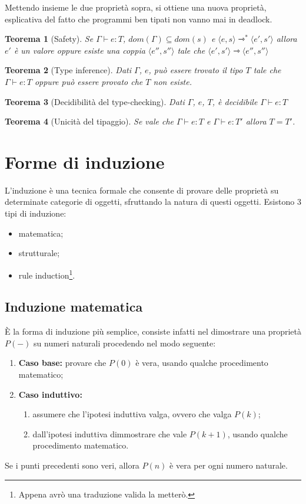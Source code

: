 \documentclass[a4paper, 11pt]{article}
\newtheorem{thm}{Teorema}[section]
\newcommand{\type}{\Gamma \vdash}
\begin{document}
Mettendo insieme le due proprietà sopra, si ottiene una nuova proprietà, esplicativa del fatto che programmi ben tipati non vanno mai in deadlock.

\begin{thm}[Safety]
	Se $\type e:T$, $dom(\Gamma) \subseteq dom(s)$ e $\langle e,s \rangle \rightarrowtriangle^\ast \langle e',s' \rangle$ allora $e'$ è un valore oppure esiste una coppia $\langle e'', s'' \rangle$ tale che $\langle e',s' \rangle \rightarrowtriangle \langle e'',s'' \rangle$
\end{thm}

\begin{thm}[Type inference]
	Dati $\Gamma$, $e$, può essere trovato il tipo $T$ tale che $\type e:T$ oppure può essere provato che $T$ non esiste.
\end{thm}

\begin{thm}[Decidibilità del type-checking]
	Dati $\Gamma$, $e$, $T$, è decidibile $\type e:T$
\end{thm}

\begin{thm}[Unicità del tipaggio]
	Se vale che $\type e:T$ e $\type e:T'$ allora $T=T'$.
\end{thm}

\section{Forme di induzione}
L'induzione è una tecnica formale che consente di provare delle proprietà su determinate categorie di oggetti, sfruttando la natura di questi oggetti.
Esistono 3 tipi di induzione:
\begin{itemize}
	\item matematica;
	\item strutturale;
	\item rule induction\footnote{Appena avrò una traduzione valida la metterò.}.
\end{itemize}

\subsection{Induzione matematica}
È la forma di induzione più semplice, consiste infatti nel dimostrare una proprietà $P(-)$ su numeri naturali procedendo nel modo seguente:
\begin{enumerate}
\item \textbf{Caso base:} provare che $P(0)$ è vera, usando qualche procedimento matematico;
\item \textbf{Caso induttivo:}\begin{enumerate}
	\item assumere che l'ipotesi induttiva valga, ovvero che valga $P(k)$;
	\item dall'ipotesi induttiva dimmostrare che vale $P(k+1)$, usando qualche procedimento matematico.
\end{enumerate}
\end{enumerate}
Se i punti precedenti sono veri, allora $P(n)$ è vera per ogni numero naturale.
\end{document}
